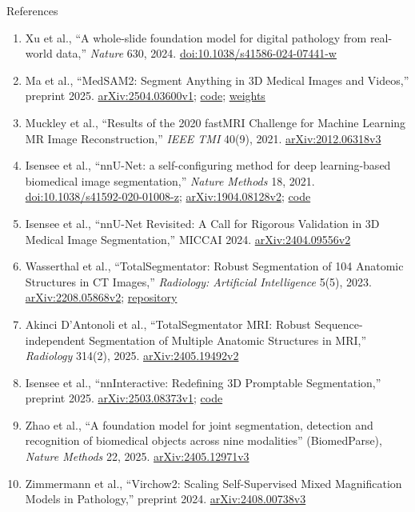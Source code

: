 \begin{frame}[allowframebreaks=0.9]{References}
\begin{enumerate}
    \item Xu et al., ``A whole-slide foundation model for digital pathology from real-world data,'' \textit{Nature} 630, 2024. \href{https://doi.org/10.1038/s41586-024-07441-w}{doi:10.1038/s41586-024-07441-w}
    \item Ma et al., ``MedSAM2: Segment Anything in 3D Medical Images and Videos,'' preprint 2025. \href{https://arxiv.org/abs/2504.03600v1}{arXiv:2504.03600v1}; \href{https://github.com/bowang-lab/MedSAM2}{code}; \href{https://huggingface.co/wanglab/MedSAM2}{weights}
    \item Muckley et al., ``Results of the 2020 fastMRI Challenge for Machine Learning MR Image Reconstruction,'' \textit{IEEE TMI} 40(9), 2021. \href{https://arxiv.org/abs/2012.06318v3}{arXiv:2012.06318v3}
    \item Isensee et al., ``nnU-Net: a self-configuring method for deep learning-based biomedical image segmentation,'' \textit{Nature Methods} 18, 2021. \href{https://doi.org/10.1038/s41592-020-01008-z}{doi:10.1038/s41592-020-01008-z}; \href{https://arxiv.org/abs/1904.08128v2}{arXiv:1904.08128v2}; \href{https://github.com/MIC-DKFZ/nnUNet}{code}
    \item Isensee et al., ``nnU-Net Revisited: A Call for Rigorous Validation in 3D Medical Image Segmentation,'' MICCAI 2024. \href{https://arxiv.org/abs/2404.09556v2}{arXiv:2404.09556v2}
    \item Wasserthal et al., ``TotalSegmentator: Robust Segmentation of 104 Anatomic Structures in CT Images,'' \textit{Radiology: Artificial Intelligence} 5(5), 2023. \href{https://arxiv.org/abs/2208.05868v2}{arXiv:2208.05868v2}; \href{https://github.com/wasserth/TotalSegmentator}{repository}
    \item Akinci D'Antonoli et al., ``TotalSegmentator MRI: Robust Sequence-independent Segmentation of Multiple Anatomic Structures in MRI,'' \textit{Radiology} 314(2), 2025. \href{https://arxiv.org/abs/2405.19492v2}{arXiv:2405.19492v2}
    \item Isensee et al., ``nnInteractive: Redefining 3D Promptable Segmentation,'' preprint 2025. \href{https://arxiv.org/abs/2503.08373v1}{arXiv:2503.08373v1}; \href{https://github.com/MIC-DKFZ/nnInteractive}{code}
    \item Zhao et al., ``A foundation model for joint segmentation, detection and recognition of biomedical objects across nine modalities'' (BiomedParse), \textit{Nature Methods} 22, 2025. \href{https://arxiv.org/abs/2405.12971v3}{arXiv:2405.12971v3}
    \item Zimmermann et al., ``Virchow2: Scaling Self-Supervised Mixed Magnification Models in Pathology,'' preprint 2024. \href{https://arxiv.org/abs/2408.00738v3}{arXiv:2408.00738v3}

\end{enumerate}
\end{frame}
